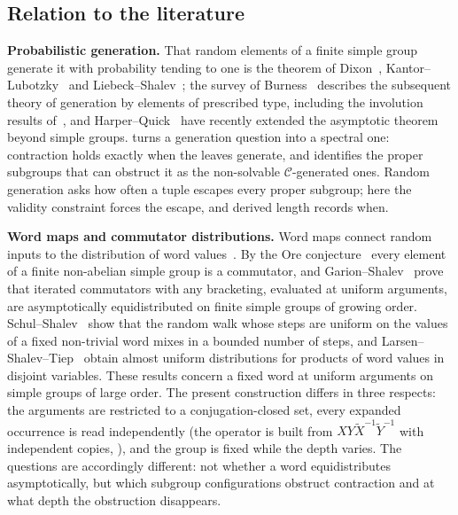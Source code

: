 \subsection*{Relation to the literature}
\medskip\noindent\textbf{Probabilistic generation.}
That random elements of a finite simple group generate it with
probability tending to one is the theorem of
Dixon~\cite{Dixon1969}, Kantor--Lubotzky~\cite{KantorLubotzky1990} and
Liebeck--Shalev~\cite{LiebeckShalev1995}; the survey of
Burness~\cite{Burness2019} describes the subsequent theory of generation
by elements of prescribed type, including the involution results
of~\cite{LiebeckShalev1996}, and Harper--Quick~\cite{HarperQuick2026}
have recently extended the asymptotic theorem beyond simple groups.
 turns a generation question into a spectral one:
contraction holds exactly when the leaves generate, and 
identifies the proper subgroups that can obstruct it as the non-solvable
$\mathcal C$-generated ones. Random generation asks how often a tuple
escapes every proper subgroup; here the validity constraint forces the
escape, and derived length records when.

\medskip\noindent\textbf{Word maps and commutator distributions.}
Word maps connect random inputs to the distribution of word
values~\cite{LarsenShalev,Shalev2013}. By the Ore
conjecture~\cite{LOST2010} every element of a finite non-abelian simple
group is a commutator, and Garion--Shalev~\cite{GarionShalev2009} prove
that iterated commutators with any bracketing, evaluated at uniform
arguments, are asymptotically equidistributed on finite simple groups of
growing order. Schul--Shalev~\cite{SchulShalev2011} show that the random
walk whose steps are uniform on the values of a fixed non-trivial word
mixes in a bounded number of steps, and
Larsen--Shalev--Tiep~\cite{LarsenShalevTiep2019} obtain almost uniform
distributions for products of word values in disjoint variables. These
results concern a fixed word at uniform arguments on simple groups of
large order. The present construction differs in three respects: the
arguments are restricted to a conjugation-closed set, every expanded
occurrence is read independently (the operator is built from
$XY\tilde X^{-1}\tilde Y^{-1}$ with independent copies,
), and the group is fixed while the depth varies.
The questions are accordingly different: not whether a word
equidistributes asymptotically, but which subgroup configurations
obstruct contraction and at what depth the obstruction disappears.

